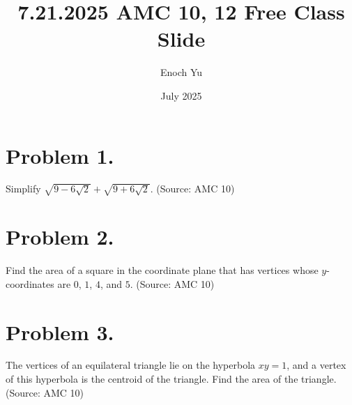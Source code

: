 \documentclass{article}
\title{7.21.2025 AMC 10, 12 Free Class Slide}
\author{Enoch Yu}
\date{July 2025}
\begin{document}
\section*{Problem 1.} %
Simplify $\sqrt{9-6\sqrt{2}}+\sqrt{9+6\sqrt{2}}$.
(Source: AMC 10)

\newpage
\section*{Problem 2.} %
Find the area of a square in the coordinate plane that has
vertices whose $y$-coordinates are $0$, $1$, $4$, and $5$.
(Source: AMC 10)

\newpage
\section*{Problem 3.} %
The vertices of an equilateral triangle lie on the hyperbola
$xy=1$, and a vertex of this hyperbola is the centroid of the
triangle. Find the area of the triangle. (Source: AMC 10)
\end{document}
